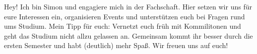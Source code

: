\begin{multicols}{2}
{
Hey! Ich bin Simon und engagiere mich in der Fachschaft. Hier setzen wir uns für eure Interessen ein, organisieren Events und unterstützen euch bei Fragen rund ums Studium. Mein Tipp für euch: Vernetzt euch früh mit Kommilitonen und geht das Studium nicht allzu gelassen an. Gemeinsam kommt ihr besser durch die ersten Semester und habt (deutlich) mehr Spaß. Wir freuen uns auf euch! 
}







%
%
%
%




\end{multicols}

